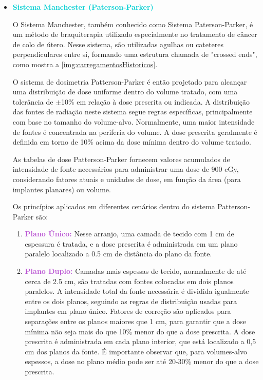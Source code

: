 \documentclass[11pt,a4paper]{article}
\begin{document}
			\begin{itemize}
				\item \textcolor{DarkTurquoise}{\textbf{Sistema Manchester (Paterson-Parker)}}
				
				O Sistema Manchester, também conhecido como Sistema Paterson-Parker, é um método de braquiterapia utilizado especialmente no tratamento de câncer de colo de útero. Nesse sistema, são utilizadas agulhas ou cateteres perpendiculares entre si, formando uma estrutura chamada de "crossed ends", como mostra a \ref{img:carregamentosHistoricos}. 
				
				O sistema de dosimetria Patterson-Parker é então projetado para alcançar uma distribuição de dose uniforme dentro do volume tratado, com uma tolerância de $\pm$10\% em relação à dose prescrita ou indicada. A distribuição das fontes de radiação neste sistema segue regras específicas, principalmente com base no tamanho do volume-alvo. Normalmente, uma maior intensidade de fontes é concentrada na periferia do volume. A dose prescrita geralmente é definida em torno de 10\% acima da dose mínima dentro do volume tratado.

				As tabelas de dose Patterson-Parker fornecem valores acumulados de intensidade de fonte necessários para administrar uma dose de 900 cGy, considerando fatores atuais e unidades de dose, em função da área (para implantes planares) ou volume.

				Os princípios aplicados em diferentes cenários dentro do sistema Patterson-Parker são:

				\begin{enumerate}[label=\textcolor{CarnationPink}{(\roman*)}]
					\item \textcolor{MediumOrchid}{\textbf{Plano Único:}} Nesse arranjo, uma camada de tecido com 1 cm de espessura é tratada, e a dose prescrita é administrada em um plano paralelo localizado a 0.5 cm de distância do plano da fonte.

					\item \textcolor{MediumOrchid}{\textbf{Plano Duplo:}} Camadas mais espessas de tecido, normalmente de até cerca de 2.5 cm, são tratadas com fontes colocadas em dois planos paralelos. A intensidade total da fonte necessária é dividida igualmente entre os dois planos, seguindo as regras de distribuição usadas para implantes em plano único. Fatores de correção são aplicados para separações entre os planos maiores que 1 cm, para garantir que a dose mínima não seja mais do que 10\% menor do que a dose prescrita. A dose prescrita é administrada em cada plano interior, que está localizado a 0,5 cm dos planos da fonte. É importante observar que, para volumes-alvo espessos, a dose no plano médio pode ser até 20-30\% menor do que a dose prescrita.
					

\end{enumerate}
\end{itemize}
\end{document}
